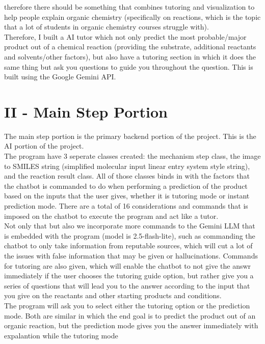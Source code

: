\documentclass{article}
\begin{document}
therefore there should be something that combines tutoring and visualization to help people explain organic chemistry (specifically on reactions, which is the topic that a lot of students in organic chemistry courses struggle with).
\\[2em]
Therefore, I built a AI tutor which not only predict the most probable/major product out of a chemical reaction (providing the substrate, additional reactants and solvents/other factors), but also have a tutoring section in which it
does the same thing but ask you questions to guide you throughout the question. This is built using the Google Gemini API.
\\[2em]

\section*{II - Main Step Portion}
The main step portion is the primary backend portion of the project. This is the AI portion of the project.
\\[2em]
The program have 3 seperate classes created: the mechanism step class, the image to SMILES string (simplified molecular input linear entry system style string), and the reaction result class.
All of those classes binds in with the factors that the chatbot is commanded to do when performing a prediction of the product based on the inputs that the user gives, whether it is tutoring mode or instant prediction
mode. There are a total of 16 considerations and commands that is imposed on the chatbot to execute the program and act like a tutor.
\\[2em]
Not only that but also we incorporate more commands to the Gemini LLM that is embedded with the program (model is 2.5-flash-lite), such as commanding the chatbot to
only take information from reputable sources, which will cut a lot of the issues with false information that may be given or hallucinations. Commands for tutoring are also given,
which will enable the chatbot to not give the answr immediately if the user chooses the tutoring guide option, but rather give you a series of questions that will lead you to the answer
according to the input that you give on the reactants and other starting products and conditions.
\\[2em]
The program will ask you to select either the tutoring option or the prediction mode. Both are similar in which the end goal is to predict the product out of an organic reaction, but the prediction mode gives you the answer immediately with expalantion while the tutoring mode
\end{document}
